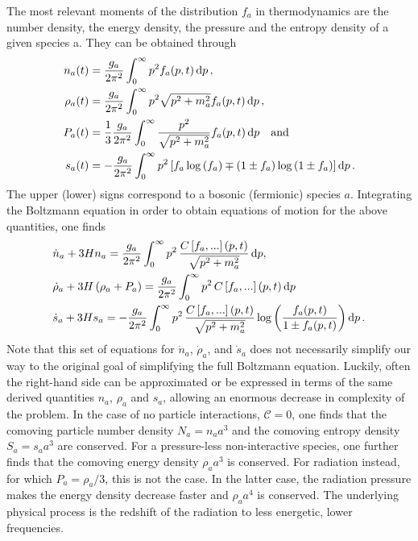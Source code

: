 The most relevant moments of the   distribution $f_a$ in thermodynamics are the number density, the energy density, the pressure and the entropy density of a given species a.  They can be obtained through 
\begin{subequations}
	\label{eq:nrhoPsdefinition}
	\begin{align}
		n_a(t) &= \frac{g_a}{2 \pi^2} \int_0^\infty p^2  f_a(p,t)  \mathop{}\!\mathrm{d} p \, ,
		\label{eq:nfromf} \\
		\rho_a(t) &= \frac{g_a}{2 \pi^2} \int_0^\infty p^2 \sqrt{p^2 + m_a^2} f_a(p,t)   \mathop{}\!\mathrm{d} p \, , \label{eq:rhofromf}\\
		P_a(t) &= \frac{1}{3} \frac{g_a}{2 \pi^2} \int_0^\infty \frac{p^2 }{\sqrt{p^2 + m_a^2}} f_a(p,t)  \mathop{}\!\mathrm{d} p \quad \text{and}\label{eq:pfromf}\\
		s_a(t) &= - \frac{g_a}{2 \pi^2}  \int_0^\infty p^2 \left[ f_a \log \left( f_a \right) \mp \left( 1 \pm f_a \right) \log \left( 1 \pm f_a \right) \right]  \mathop{}\!\mathrm{d} p \, . \label{eq:sfromf}
	\end{align}
\end{subequations}
The upper  (lower) signs correspond to a bosonic (fermionic) species $a$. Integrating the Boltzmann equation in order to obtain equations of motion for the above quantities, one finds 
\begin{subequations}
	\label{eq:BoltzmannTower}
	\begin{align}
		&\dot{n}_a + 3 H n_a = \frac{g_a}{2 \pi^2} \int_0^\infty p^2 \, \frac{C\left[ f_a, ... \right](p,t)}{\sqrt{p^2 + m_a^2}}  \mathop{}\!\mathrm{d} p, \label{eq:nBoltzmann} \\
		&\dot{\rho}_a + 3 H\left( \rho_a + P_a \right) = \frac{g_a}{2 \pi^2} \int_0^\infty p^2 \, C\left[ f_a, ... \right](p,t)  \mathop{}\!\mathrm{d} p \label{eq:rhoBoltzmann}\\
		&\dot{s}_a + 3 H s_a = - \frac{g_a}{2 \pi^2} \int_0^\infty p^2 \,  \frac{C\left[ f_a, ... \right](p,t)}{\sqrt{p^2 + m_a^2}} \log \left( \frac{f_a(p,t)}{1 \pm f_a(p,t)} \right)   \mathop{}\!\mathrm{d} p\label{eq:sBoltzmann} \, .
	\end{align}
\end{subequations}
Note that this set of equations for $\dot{n}_a$, $\dot{\rho}_a$, and $\dot{s}_a$ does not necessarily simplify our way to the original goal of simplifying the full Boltzmann equation. Luckily, often the right-hand side can be approximated or be expressed in terms of the same derived quantities $n_a$, $\rho_a$ and $s_a$, allowing an enormous decrease in complexity of the problem. In the case  of no particle interactions, $\mathcal{C} = 0$, one finds that the comoving particle number density $N_a = n_a  a^3 $ and the comoving entropy density $S_a = s_a a^3 $ are conserved. For a pressure-less non-interactive species, one further finds that the comoving energy density $\rho_a a^3$ is conserved. For radiation instead, for which $P_a = \rho_a / 3$, this is not the case. In the latter case, the radiation pressure makes the energy density decrease faster and $\rho_a a^4$ is conserved. The underlying physical process is the redshift of the radiation to less energetic, lower frequencies. 

